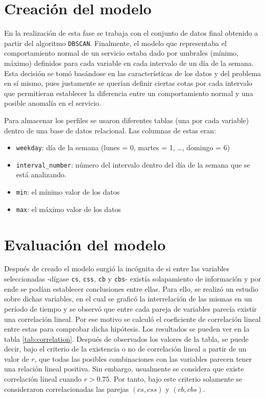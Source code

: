 \section{Creación del modelo}
En la realización de esta fase se trabaja con el conjunto de datos final
obtenido a partir del algoritmo \texttt{DBSCAN}. Finalmente, el modelo que
representaba el comportamiento normal de un servicio estaba dado por umbrales
(mínimo, máximo) definidos para cada variable en cada intervalo de un día de la
semana. Esta decisión se tomó basándose en las características de los datos y
del problema en sí mismo, pues justamente se querían definir ciertas cotas por
cada intervalo que permitieran establecer la diferencia entre un comportamiento
normal y una posible anomalía en el servicio.

Para almacenar los perfiles se usaron diferentes tablas (una por cada variable) 
dentro de una base de datos relacional. Las columnas de estas eran:
\begin{itemize}
 \item \texttt{weekday}: día de la semana (lunes = 0, martes = 1, \ldots, 
  domingo = 6)
 \item \texttt{interval\_number}: número del intervalo dentro del día de la semana 
  que se está analizando.
 \item \texttt{min}: el mínimo valor de los datos
 \item \texttt{max}: el máximo valor de los datos
\end{itemize}

\section{Evaluación del modelo}
Después de creado el modelo surgió la incógnita de si entre las variables
seleccionadas -dígase \texttt{cs}, \texttt{css}, \texttt{cb} y \texttt{cbs}-
existía solapamiento de información y por ende se podían establecer conclusiones
entre ellas. Para ello, se realizó un estudio sobre dichas variables, en el cual
se graficó la interrelación de las mismas en un período de tiempo y se observó
que entre cada pareja de variables parecía existir una correlación lineal. Por
ese motivo se calculó el coeficiente de correlación lineal entre estas para
comprobar dicha hipótesis. Los resultados se pueden ver en la tabla
\ref{tab:correlation}. Después de observados los valores de la tabla, se puede
decir, bajo el criterio de la existencia o no de correlación lineal a partir de
un valor de $r$, que todas las posibles combinaciones con las variables parecen
tener una relación lineal positiva. Sin embargo, usualmente se considera que
existe correlación lineal cuando $r > 0.75$\cite{Cue1989}. Por tanto, bajo este
criterio solamente se consideraron correlacionadas las parejas $(cs, css)$ y
$(cb, cbs)$. %

